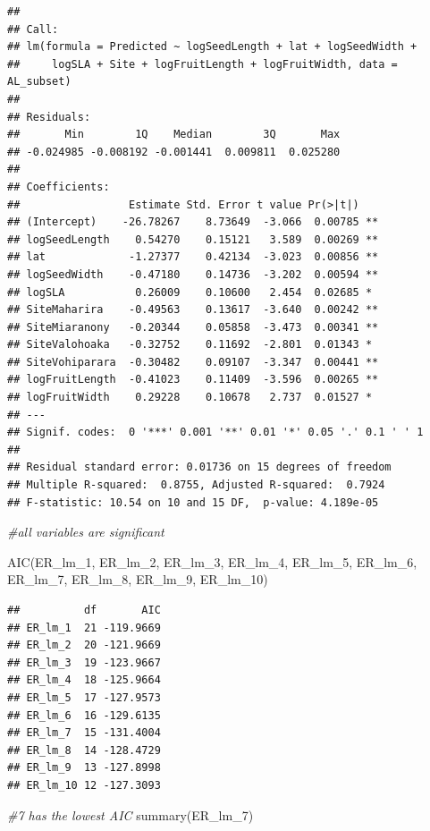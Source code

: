 \documentclass[
  12pt,
]{article}
\newenvironment{Shaded}{\begin{snugshade}}{\end{snugshade}}
\newcommand{\CommentTok}[1]{\textcolor[rgb]{0.56,0.35,0.01}{\textit{#1}}}
\newcommand{\FunctionTok}[1]{\textcolor[rgb]{0.00,0.00,0.00}{#1}}
\newcommand{\NormalTok}[1]{#1}
\begin{document}
\begin{verbatim}
## 
## Call:
## lm(formula = Predicted ~ logSeedLength + lat + logSeedWidth + 
##     logSLA + Site + logFruitLength + logFruitWidth, data = AL_subset)
## 
## Residuals:
##       Min        1Q    Median        3Q       Max 
## -0.024985 -0.008192 -0.001441  0.009811  0.025280 
## 
## Coefficients:
##                 Estimate Std. Error t value Pr(>|t|)   
## (Intercept)    -26.78267    8.73649  -3.066  0.00785 **
## logSeedLength    0.54270    0.15121   3.589  0.00269 **
## lat             -1.27377    0.42134  -3.023  0.00856 **
## logSeedWidth    -0.47180    0.14736  -3.202  0.00594 **
## logSLA           0.26009    0.10600   2.454  0.02685 * 
## SiteMaharira    -0.49563    0.13617  -3.640  0.00242 **
## SiteMiaranony   -0.20344    0.05858  -3.473  0.00341 **
## SiteValohoaka   -0.32752    0.11692  -2.801  0.01343 * 
## SiteVohiparara  -0.30482    0.09107  -3.347  0.00441 **
## logFruitLength  -0.41023    0.11409  -3.596  0.00265 **
## logFruitWidth    0.29228    0.10678   2.737  0.01527 * 
## ---
## Signif. codes:  0 '***' 0.001 '**' 0.01 '*' 0.05 '.' 0.1 ' ' 1
## 
## Residual standard error: 0.01736 on 15 degrees of freedom
## Multiple R-squared:  0.8755, Adjusted R-squared:  0.7924 
## F-statistic: 10.54 on 10 and 15 DF,  p-value: 4.189e-05
\end{verbatim}

\begin{Shaded}
\begin{Highlighting}[]
\CommentTok{\#all variables are significant}

\FunctionTok{AIC}\NormalTok{(ER\_lm\_1, ER\_lm\_2, ER\_lm\_3, ER\_lm\_4, ER\_lm\_5, ER\_lm\_6, ER\_lm\_7, ER\_lm\_8, ER\_lm\_9, ER\_lm\_10)}
\end{Highlighting}
\end{Shaded}

\begin{verbatim}
##          df       AIC
## ER_lm_1  21 -119.9669
## ER_lm_2  20 -121.9669
## ER_lm_3  19 -123.9667
## ER_lm_4  18 -125.9664
## ER_lm_5  17 -127.9573
## ER_lm_6  16 -129.6135
## ER_lm_7  15 -131.4004
## ER_lm_8  14 -128.4729
## ER_lm_9  13 -127.8998
## ER_lm_10 12 -127.3093
\end{verbatim}

\begin{Shaded}
\begin{Highlighting}[]
\CommentTok{\#7 has the lowest AIC}
\FunctionTok{summary}\NormalTok{(ER\_lm\_7)}
\end{Highlighting}
\end{Shaded}
\end{document}

